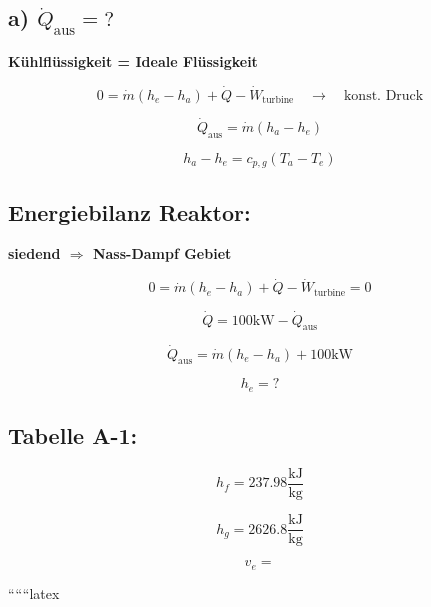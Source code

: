 \subsection*{a) $\dot{Q}_{\text{aus}} = ?$}

\textbf{Kühlflüssigkeit = Ideale Flüssigkeit}

\[
0 = \dot{m} (h_e - h_a) + \dot{Q} - \dot{W}_{\text{turbine}} \quad \rightarrow \quad \text{konst. Druck}
\]

\[
\dot{Q}_{\text{aus}} = \dot{m} (h_a - h_e)
\]

\[
h_a - h_e = c_{p,g} (T_a - T_e)
\]

\subsection*{Energiebilanz Reaktor:}

\textbf{siedend $\Rightarrow$ Nass-Dampf Gebiet}

\[
0 = \dot{m} (h_e - h_a) + \dot{Q} - \dot{W}_{\text{turbine}} = 0
\]

\[
\dot{Q} = 100 \text{kW} - \dot{Q}_{\text{aus}}
\]

\[
\dot{Q}_{\text{aus}} = \dot{m} (h_e - h_a) + 100 \text{kW}
\]

\[
h_e = ?
\]

\subsection*{Tabelle A-1:}

\[
h_f = 237.98 \frac{\text{kJ}}{\text{kg}}
\]

\[
h_g = 2626.8 \frac{\text{kJ}}{\text{kg}}
\]

\[
v_e = 
\]

``````latex